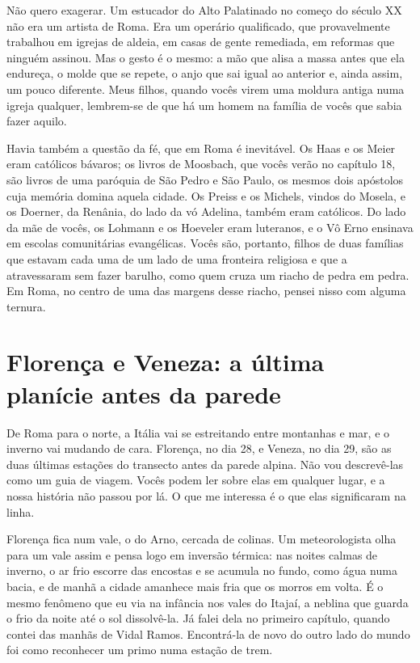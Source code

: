 \documentclass[
  brazilian,
  11pt,
  openany]{book}
\begin{document}
Não quero exagerar. Um estucador do Alto Palatinado no começo do século
XX não era um artista de Roma. Era um operário qualificado, que
provavelmente trabalhou em igrejas de aldeia, em casas de gente
remediada, em reformas que ninguém assinou. Mas o gesto é o mesmo: a mão
que alisa a massa antes que ela endureça, o molde que se repete, o anjo
que sai igual ao anterior e, ainda assim, um pouco diferente. Meus
filhos, quando vocês virem uma moldura antiga numa igreja qualquer,
lembrem-se de que há um homem na família de vocês que sabia fazer
aquilo.

Havia também a questão da fé, que em Roma é inevitável. Os Haas e os
Meier eram católicos bávaros; os livros de Moosbach, que vocês verão no
capítulo 18, são livros de uma paróquia de São Pedro e São Paulo, os
mesmos dois apóstolos cuja memória domina aquela cidade. Os Preiss e os
Michels, vindos do Mosela, e os Doerner, da Renânia, do lado da vó
Adelina, também eram católicos. Do lado da mãe de vocês, os Lohmann e os
Hoeveler eram luteranos, e o Vô Erno ensinava em escolas comunitárias
evangélicas. Vocês são, portanto, filhos de duas famílias que estavam
cada uma de um lado de uma fronteira religiosa e que a atravessaram sem
fazer barulho, como quem cruza um riacho de pedra em pedra. Em Roma, no
centro de uma das margens desse riacho, pensei nisso com alguma ternura.

\section{Florença e Veneza: a última planície antes da
parede}\label{florenuxe7a-e-veneza-a-uxfaltima-planuxedcie-antes-da-parede}

De Roma para o norte, a Itália vai se estreitando entre montanhas e mar,
e o inverno vai mudando de cara. Florença, no dia 28, e Veneza, no dia
29, são as duas últimas estações do transecto antes da parede alpina.
Não vou descrevê-las como um guia de viagem. Vocês podem ler sobre elas
em qualquer lugar, e a nossa história não passou por lá. O que me
interessa é o que elas significaram na linha.

Florença fica num vale, o do Arno, cercada de colinas. Um meteorologista
olha para um vale assim e pensa logo em inversão térmica: nas noites
calmas de inverno, o ar frio escorre das encostas e se acumula no fundo,
como água numa bacia, e de manhã a cidade amanhece mais fria que os
morros em volta. É o mesmo fenômeno que eu via na infância nos vales do
Itajaí, a neblina que guarda o frio da noite até o sol dissolvê-la. Já
falei dela no primeiro capítulo, quando contei das manhãs de Vidal
Ramos. Encontrá-la de novo do outro lado do mundo foi como reconhecer um
primo numa estação de trem.
\end{document}
